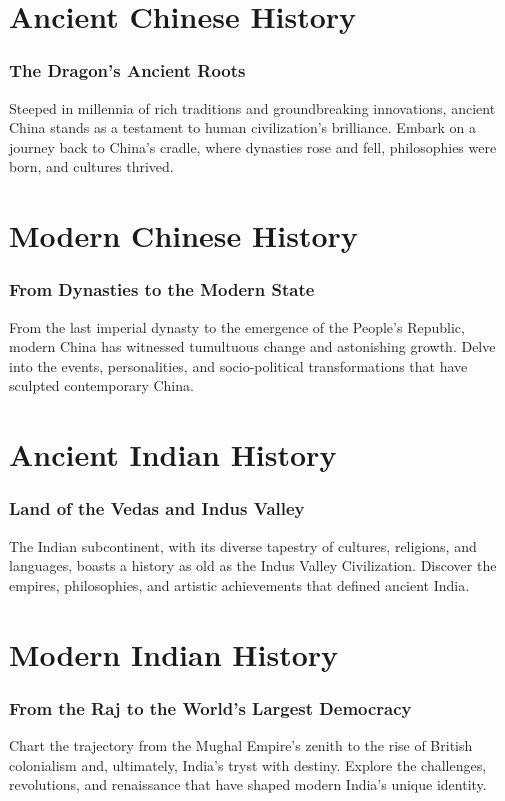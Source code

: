 \documentclass[a4paper,12pt]{book}
\begin{document}
\chapter{Ancient Chinese History}
\subsection*{The Dragon's Ancient Roots}
Steeped in millennia of rich traditions and groundbreaking innovations, ancient China stands as a testament to human civilization's brilliance. Embark on a journey back to China's cradle, where dynasties rose and fell, philosophies were born, and cultures thrived.

\chapter{Modern Chinese History}
\subsection*{From Dynasties to the Modern State}
From the last imperial dynasty to the emergence of the People's Republic, modern China has witnessed tumultuous change and astonishing growth. Delve into the events, personalities, and socio-political transformations that have sculpted contemporary China.

\chapter{Ancient Indian History}
\subsection*{Land of the Vedas and Indus Valley}
The Indian subcontinent, with its diverse tapestry of cultures, religions, and languages, boasts a history as old as the Indus Valley Civilization. Discover the empires, philosophies, and artistic achievements that defined ancient India.

\chapter{Modern Indian History}
\subsection*{From the Raj to the World's Largest Democracy}
Chart the trajectory from the Mughal Empire's zenith to the rise of British colonialism and, ultimately, India's tryst with destiny. Explore the challenges, revolutions, and renaissance that have shaped modern India's unique identity.
\end{document}
